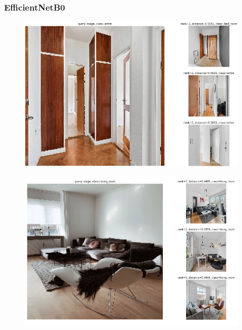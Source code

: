 \subsubsection*{EfficientNetB0}
\begin{figure}[H]
    \centering
    \includegraphics[width =\textwidth]{pictures/random/efnentreplot}
\end{figure}

\begin{figure}[H]
    \centering
    \includegraphics[width =\textwidth]{pictures/random/efnlivingplot}
\end{figure}

